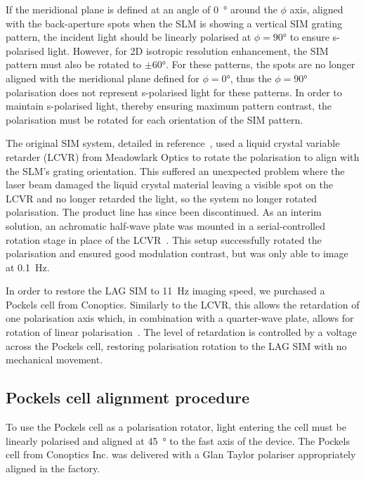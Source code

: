 If the meridional plane is defined at an angle of \SI{0}{\degree} around the $\phi$ axis, aligned with the back-aperture spots when the SLM is showing a vertical SIM grating pattern, the incident light should be linearly polarised at $\phi=90\si{\degree}$ to ensure s-polarised light. 
However, for 2D isotropic resolution enhancement, the SIM pattern must also be rotated to $\pm60\si{\degree}$. 
For these patterns, the spots are no longer aligned with the meridional plane defined for $\phi=0\si{\degree}$, thus the $\phi=90\si{\degree}$ polarisation does not represent s-polarised light for these patterns. 
In order to maintain s-polarised light, thereby ensuring maximum pattern contrast, the polarisation must be rotated for each orientation of the SIM pattern. 


The original SIM system, detailed in reference~\cite{young2016guide}, used a liquid crystal variable retarder (LCVR) from Meadowlark Optics to rotate the polarisation to align with the SLM's grating orientation. 
This suffered an unexpected problem where the laser beam damaged the liquid crystal material leaving a visible spot on the LCVR and no longer retarded the light, so the system no longer rotated polarisation. 
The product line has since been discontinued.
As an interim solution, an achromatic half-wave plate was mounted in a serial-controlled rotation stage in place of the LCVR~\cite[\textit{ch. 8}]{hecht2017optics}. 
This setup successfully rotated the polarisation and ensured good modulation contrast, but was only able to image at \SI{0.1}{\hertz}. 

In order to restore the LAG SIM to \SI{11}{\hertz} imaging speed, we purchased a Pockels cell from Conoptics. 
Similarly to the LCVR, this allows the retardation of one polarisation axis which, in combination with a quarter-wave plate, allows for rotation of linear polarisation~\cite[\textit{ch. 8}]{hecht2017optics}.
The level of retardation is controlled by a voltage across the Pockels cell, restoring polarisation rotation to the LAG SIM with no mechanical movement. 

\subsection{Pockels cell alignment procedure}
To use the Pockels cell as a polarisation rotator, light entering the cell must be linearly polarised and aligned at \SI{45}{\degree} to the fast axis of the device. 
The Pockels cell from Conoptics Inc. was delivered with a Glan Taylor polariser appropriately aligned in the factory. 

